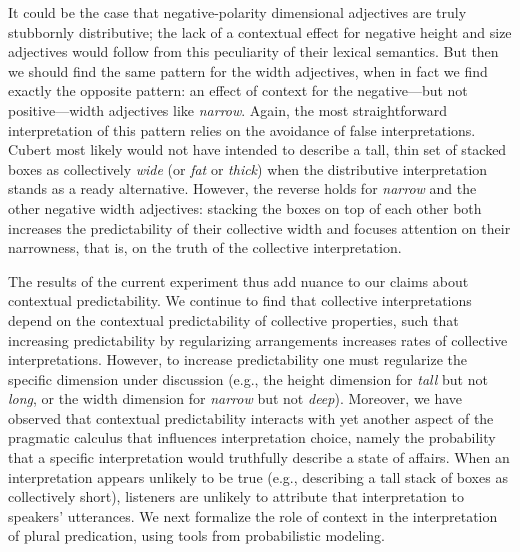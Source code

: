 \documentclass[preprint,12pt,authoryear,titlepage]{elsarticle}
\begin{document}
It could be the case that negative-polarity dimensional adjectives are truly stubbornly distributive; the lack of a contextual effect for negative height and size adjectives would follow from this peculiarity of their lexical semantics. But then we should find the same pattern for the width adjectives, when in fact we find exactly the opposite pattern: an effect of context for the negative---but not positive---width adjectives like \emph{narrow}.  Again, the most straightforward interpretation of this pattern relies on the avoidance of false interpretations. Cubert most likely would not have intended to describe a tall, thin set of stacked boxes as collectively \emph{wide} (or \emph{fat} or \emph{thick}) when the distributive interpretation stands as a ready alternative. However, the reverse holds for \emph{narrow} and the other negative width adjectives: stacking the boxes on top of each other both increases the predictability of their collective width and focuses attention on their narrowness, that is, on the truth of the collective interpretation.

The results of the current experiment thus add nuance to our claims about contextual predictability. We continue to find that collective interpretations depend on the contextual predictability of collective properties, such that increasing predictability by regularizing arrangements increases rates of collective interpretations. However, to increase predictability one must regularize the specific dimension under discussion (e.g., the height dimension for \emph{tall} but not \emph{long}, or the width dimension for \emph{narrow} but not \emph{deep}). Moreover, we have observed that contextual predictability interacts with yet another aspect of the pragmatic calculus that influences interpretation choice, namely the probability that a specific interpretation would truthfully describe a state of affairs. When an interpretation appears unlikely to be true (e.g., describing a tall stack of boxes as collectively short), listeners are unlikely to attribute that interpretation to speakers' utterances. We next formalize the role of context in the interpretation of plural predication, using tools from probabilistic modeling.

\end{document}
